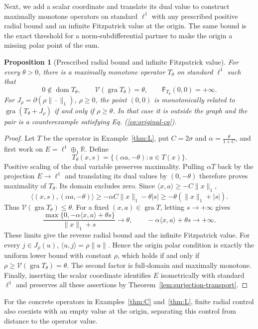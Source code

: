 \documentclass[11pt]{article}
\newcommand{\R}{\mathbb R}
\newcommand{\gra}{\operatorname{gra}}
\newcommand{\dom}{\operatorname{dom}}
\newcommand{\pair}[2]{\langle #1,#2\rangle}
\newtheorem{proposition}{Proposition}
\theoremstyle{definition}
\theoremstyle{remark}
\begin{document}
Next, we add a scalar coordinate and translate its dual value to construct maximally monotone operators on standard $\ell^1$ with any prescribed positive radial bound and an infinite Fitzpatrick value at the origin. The same bound is the exact threshold for a norm-subdifferential partner to make the origin a missing polar point of the sum.

\begin{proposition}[Prescribed radial bound and infinite Fitzpatrick value]
\label{cor:radial-infinite-fitzpatrick}
For every $\theta>0$, there is a maximally monotone operator $T_\theta$ on standard $\ell^1$ such that
\[
0\notin\dom T_\theta,\qquad
\mathcal V(\gra T_\theta)=\theta,\qquad
\mathsf F_{T_\theta}(0,0)=+\infty.
\]
For $J_\rho=\partial(\rho\|\cdot\|_1)$, $\rho\ge0$, the point $(0,0)$ is monotonically related to $\gra(T_\theta+J_\rho)$ if and only if $\rho\ge\theta$. In that case it is outside the graph and the pair is a counterexample satisfying Eq. (\ref{eq:original-cq}).
\end{proposition}
\begin{proof}
Let $T$ be the operator in Example~\ref{thm:L}, put $C=2\sigma$ and $\alpha=\frac{\theta}{1+C}$, and first work on $E=\ell^1\oplus_1\R$. Define
\[
T_\theta(x,s)=\{(\alpha a,-\theta):a\in T(x)\}.
\]
Positive scaling of the dual variable preserves maximality. Pulling $\alpha T$ back by the projection $E\to\ell^1$ and translating its dual values by $(0,-\theta)$ therefore proves maximality of $T_\theta$. Its domain excludes zero. Since $\pair{x}{a}\ge-C\|x\|_1$,
\[
\pair{(x,s)}{(\alpha a,-\theta)}
\ge-\alpha C\|x\|_1-\theta|s|
\ge-\theta(\|x\|_1+|s|).
\]
Thus $\mathcal V(\gra T_\theta)\le\theta$. For a fixed $(x,a)\in\gra T$, letting $s\to+\infty$ gives
\[
\frac{\max\{0,-\alpha\pair{x}{a}+\theta s\}}{\|x\|_1+s}\longrightarrow\theta,
\qquad
-\alpha\pair{x}{a}+\theta s\longrightarrow+\infty.
\]
These limits give the reverse radial bound and the infinite Fitzpatrick value. For every $j\in J_\rho(u)$, $\pair{u}{j}=\rho\|u\|$. Hence the origin polar condition is exactly the uniform lower bound with constant $\rho$, which holds if and only if $\rho\ge\mathcal V(\gra T_\theta)=\theta$. The second factor is full-domain and maximally monotone. Finally, inserting the scalar coordinate identifies $E$ isometrically with standard $\ell^1$ and preserves all these assertions by Theorem~\ref{lem:surjection-transport}.
\end{proof}

For the concrete operators in Examples~\ref{thm:C} and~\ref{thm:L}, finite radial control also coexists with an empty value at the origin, separating this control from distance to the operator value.
\end{document}
